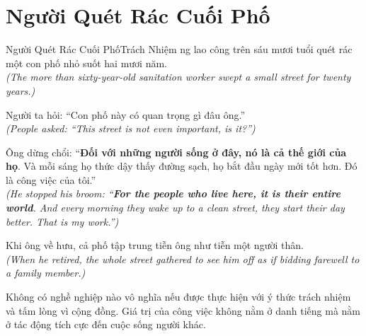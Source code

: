 \section{Người Quét Rác Cuối Phố}
\begin{truyen}{Người Quét Rác Cuối Phố}{Trách Nhiệm}
ng lao công trên sáu mươi tuổi quét rác một con phố nhỏ suốt hai mươi năm.\\
\textit{(The more than sixty-year-old sanitation worker swept a small street for twenty years.)}

Người ta hỏi: ``Con phố này có quan trọng gì đâu ông.''\\
\textit{(People asked: ``This street is not even important, is it?'')}

Ông dừng chổi: ``\textbf{Đối với những người sống ở đây, nó là cả thế giới của họ}. Và mỗi sáng họ thức dậy thấy đường sạch, họ bắt đầu ngày mới tốt hơn. Đó là công việc của tôi.''\\
\textit{(He stopped his broom: ``\textbf{For the people who live here, it is their entire world}. And every morning they wake up to a clean street, they start their day better. That is my work.'')}

Khi ông về hưu, cả phố tập trung tiễn ông như tiễn một người thân.\\
\textit{(When he retired, the whole street gathered to see him off as if bidding farewell to a family member.)}
\end{truyen}
\begin{baihoc}
  Không có nghề nghiệp nào vô nghĩa nếu được thực hiện với ý thức trách nhiệm và tấm lòng vì cộng đồng. Giá trị của công việc không nằm ở danh tiếng mà nằm ở tác động tích cực đến cuộc sống người khác.
\end{baihoc}

